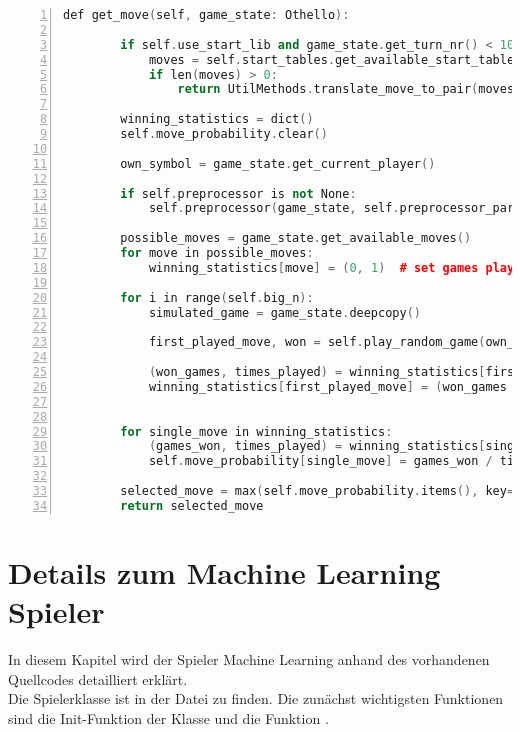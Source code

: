 \begin{lstlisting}[caption = {get\_move Funktion des Alpha-Beta Spielers}, language = cpp, captionpos = t , numbers=left, label={lst:ab1}]
    def get_move(self, game_state: Othello):

        if self.use_start_lib and game_state.get_turn_nr() < 10:  # check whether start move match
            moves = self.start_tables.get_available_start_tables(game_state)
            if len(moves) > 0:
                return UtilMethods.translate_move_to_pair(moves[random.randrange(len(moves))])

        winning_statistics = dict()
        self.move_probability.clear()

        own_symbol = game_state.get_current_player()

        if self.preprocessor is not None:
            self.preprocessor(game_state, self.preprocessor_parameter, self.heuristic)

        possible_moves = game_state.get_available_moves()
        for move in possible_moves:
            winning_statistics[move] = (0, 1)  # set games played to 1 to avoid division by zero error

        for i in range(self.big_n):
            simulated_game = game_state.deepcopy()

            first_played_move, won = self.play_random_game(own_symbol, simulated_game)

            (won_games, times_played) = winning_statistics[first_played_move]
            winning_statistics[first_played_move] = (won_games + won, times_played + 1)


        for single_move in winning_statistics:
            (games_won, times_played) = winning_statistics[single_move]
            self.move_probability[single_move] = games_won / times_played

        selected_move = max(self.move_probability.items(), key=operator.itemgetter(1))[0]
        return selected_move
\end{lstlisting}

\section{Details zum Machine Learning Spieler}
In diesem Kapitel wird der Spieler Machine Learning anhand des vorhandenen Quellcodes detailliert erklärt.
\\Die Spielerklasse  ist in der Datei  zu finden.
Die zunächst wichtigsten Funktionen sind die Init-Funktion der Klasse und die Funktion .

